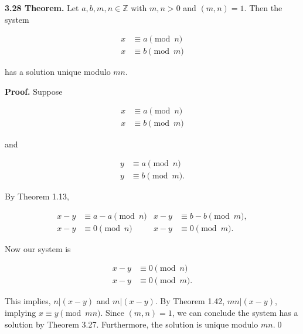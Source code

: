 \documentclass[12pt]{article}
\begin{document}
\noindent\textbf{3.28 Theorem.} Let $a,b,m,n\in\mathbb{Z}$ with $m,n>0$ and $(m,n)=1$. Then the system

\begin{align*}
x &\equiv a\pmod n\\
x &\equiv b\pmod m
\end{align*}

\noindent has a solution unique modulo $mn$.

\bigskip

\noindent\textbf{Proof.} Suppose

\begin{align*}
x &\equiv a\pmod n\\
x &\equiv b\pmod m
\end{align*}

\noindent and 

\begin{align*}
y &\equiv a\pmod n\\
y &\equiv b\pmod m.
\end{align*}

\noindent By Theorem 1.13,

\begin{align*}
x - y &\equiv a - a\pmod n & x - y &\equiv b - b\pmod m, \\
x - y &\equiv 0\pmod n & x - y &\equiv 0\pmod m.
\end{align*}

\noindent Now our system is 

\begin{align*}
x - y &\equiv 0\pmod n \\
x - y &\equiv 0\pmod m.
\end{align*}

\noindent This implies, $n|(x-y)$ and $m|(x-y)$. By Theorem 1.42, $mn|(x-y)$, implying $x\equiv y\pmod {mn}$. Since $(m,n)=1$, we can conclude the system has a solution by Theorem 3.27. Furthermore, the solution is unique modulo $mn$.\qed
\end{document}
